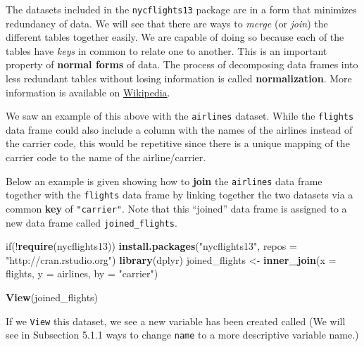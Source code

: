 \documentclass[]{tufte-book}
\newenvironment{Shaded}{\begin{snugshade}}{\end{snugshade}}
\newcommand{\KeywordTok}[1]{\textcolor[rgb]{0.13,0.29,0.53}{\textbf{{#1}}}}
\newcommand{\DataTypeTok}[1]{\textcolor[rgb]{0.13,0.29,0.53}{{#1}}}
\newcommand{\StringTok}[1]{\textcolor[rgb]{0.31,0.60,0.02}{{#1}}}
\newcommand{\NormalTok}[1]{{#1}}
\begin{document}
The datasets included in the \texttt{nycflights13} package are in a form
that minimizes redundancy of data. We will see that there are ways to
\emph{merge} (or \emph{join}) the different tables together easily. We
are capable of doing so because each of the tables have \emph{keys} in
common to relate one to another. This is an important property of
\textbf{normal forms} of data. The process of decomposing data frames
into less redundant tables without losing information is called
\textbf{normalization}. More information is available on
\href{https://en.wikipedia.org/wiki/Database_normalization}{Wikipedia}.

We saw an example of this above with the \texttt{airlines} dataset.
While the \texttt{flights} data frame could also include a column with
the names of the airlines instead of the carrier code, this would be
repetitive since there is a unique mapping of the carrier code to the
name of the airline/carrier.

Below an example is given showing how to \textbf{join} the
\texttt{airlines} data frame together with the \texttt{flights} data
frame by linking together the two datasets via a common \textbf{key} of
\texttt{"carrier"}. Note that this ``joined'' data frame is assigned to
a new data frame called \texttt{joined\_flights}.

\begin{Shaded}
\begin{Highlighting}[]
\NormalTok{if(!}\KeywordTok{require}\NormalTok{(nycflights13))}
  \KeywordTok{install.packages}\NormalTok{(}\StringTok{"nycflights13"}\NormalTok{, }\DataTypeTok{repos =} \StringTok{"http://cran.rstudio.org"}\NormalTok{)}
\KeywordTok{library}\NormalTok{(dplyr)}
\NormalTok{joined_flights <-}\StringTok{ }\KeywordTok{inner_join}\NormalTok{(}\DataTypeTok{x =} \NormalTok{flights, }\DataTypeTok{y =} \NormalTok{airlines, }\DataTypeTok{by =} \StringTok{"carrier"}\NormalTok{)}
\end{Highlighting}
\end{Shaded}

\begin{Shaded}
\begin{Highlighting}[]
\KeywordTok{View}\NormalTok{(joined_flights)}
\end{Highlighting}
\end{Shaded}

If we \texttt{View} this dataset, we see a new variable has been created
called (We will see in Subsection 5.1.1 ways to change \texttt{name} to
a more descriptive variable name.)
\end{document}
